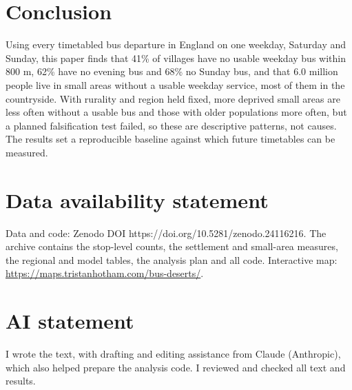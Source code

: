 \documentclass[11pt,a4paper]{article}
\begin{document}
\section{Conclusion}\label{sec:conc}
Using every timetabled bus departure in England on one weekday, Saturday and Sunday, this paper finds that 41\% of villages have no usable weekday bus within 800 m, 62\% have no evening bus and 68\% no Sunday bus, and that 6.0 million people live in small areas without a usable weekday service, most of them in the countryside. With rurality and region held fixed, more deprived small areas are less often without a usable bus and those with older populations more often, but a planned falsification test failed, so these are descriptive patterns, not causes. The results set a reproducible baseline against which future timetables can be measured.

\section*{Data availability statement}
Data and code: Zenodo DOI https://doi.org/10.5281/zenodo.24116216. The archive contains the stop-level counts, the settlement and small-area measures, the regional and model tables, the analysis plan and all code. Interactive map: \url{https://maps.tristanhotham.com/bus-deserts/}.

\section*{AI statement}
I wrote the text, with drafting and editing assistance from Claude (Anthropic), which also helped prepare the analysis code. I reviewed and checked all text and results.
\end{document}
